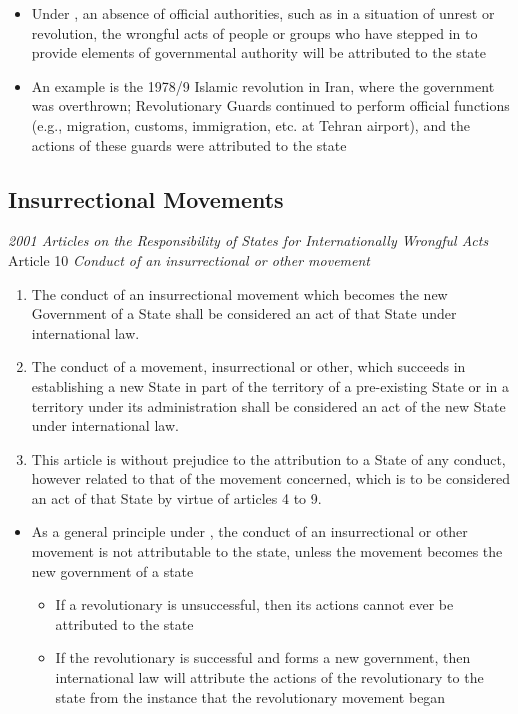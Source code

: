 \begin{itemize}
    \item Under , an absence of official authorities, such as in a situation of unrest or revolution, the wrongful acts of people or groups who have stepped in to provide elements of governmental authority will be attributed to the state
    \item An example is the 1978/9 Islamic revolution in Iran, where the government was overthrown; Revolutionary Guards continued to perform official functions (e.g., migration, customs, immigration, etc. at Tehran airport), and the actions of these guards were attributed to the state
\end{itemize}

\subsection{Insurrectional Movements}

\begin{conventiondetails}{\textit{2001 Articles on the Responsibility of States for Internationally Wrongful Acts} Article 10}
    \flushleft
    \textit{Conduct of an insurrectional or other movement}

    \begin{enumerate}
        \item The conduct of an insurrectional movement which becomes the new Government of a State shall be considered an act of that State under international law.
        \item The conduct of a movement, insurrectional or other, which succeeds in establishing a new State in part of the territory of a pre-existing State or in a territory under its administration shall be considered an act of the new State under international law.
        \item This article is without prejudice to the attribution to a State of any conduct, however related to that of the movement concerned, which is to be considered an act of that State by virtue of articles 4 to 9.
    \end{enumerate}
\end{conventiondetails}

\begin{itemize}
    \item As a general principle under , the conduct of an insurrectional or other movement is not attributable to the state, unless the movement becomes the new government of a state
    \begin{itemize}
        \item If a revolutionary is unsuccessful, then its actions cannot ever be attributed to the state
        \item If the revolutionary is successful and forms a new government, then international law will attribute the actions of the revolutionary to the state from the instance that the revolutionary movement began
    \end{itemize}
\end{itemize}

